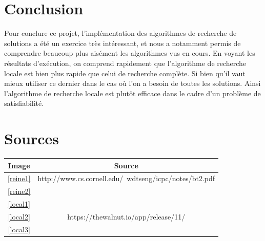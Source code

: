 \documentclass{article}
\begin{document}
\section{Conclusion}
Pour conclure ce projet, l'implémentation des algorithmes de recherche de solutions a été un exercice très intéressant, et nous a notamment permis de comprendre beaucoup plus aisément les algorithmes vus en cours. En voyant les résultats d'exécution, on comprend rapidement que l'algorithme de recherche locale est bien plus rapide que celui de recherche complète. Si bien qu'il vaut mieux utiliser ce dernier dans le cas où l'on a besoin de toutes les solutions. Ainsi l'algorithme de recherche locale est plutôt efficace dans le cadre d'un problème de satisfiabilité.
\section{Sources}

\begin{tabular}{|c|c|}
\hline
Image & Source \\
\hline
\ref{reine1} & http://www.cs.cornell.edu/~wdtseng/icpc/notes/bt2.pdf \\
\ref{reine2} &  \\
\hline
\ref{local1} & \\
\ref{local2} &  https://thewalnut.io/app/release/11/ \\
\ref{local3} &  \\
\hline
\end{tabular}

\end{document}
